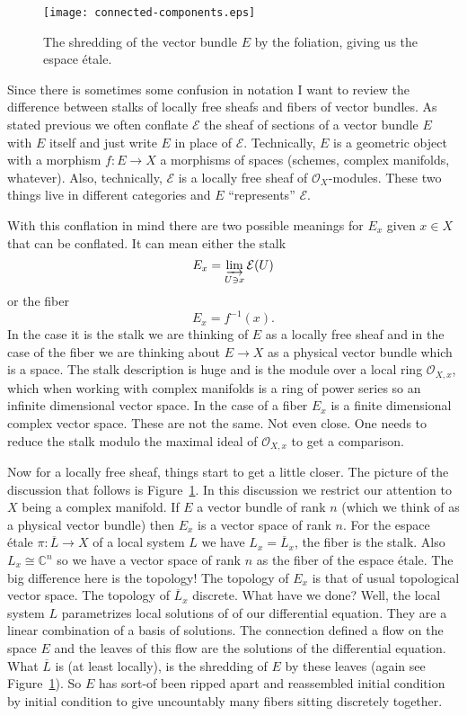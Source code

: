 \documentclass[12pt]{book}
\numberwithin{equation}{section}
\theoremstyle{definition}
\theoremstyle{remark}
\newcommand{\CC}{\mathbb{C}}
\newcommand{\Ocal}{\mathcal{O}}
\begin{document}
\begin{figure}[h]
	\begin{center}
		\texttt{[image: connected-components.eps]}
	\end{center}
	\caption{The shredding of the vector bundle $E$ by the foliation, giving us the espace \'etale.}\label{F:connected-components}
\end{figure}


Since there is sometimes some confusion in notation I want to review the difference between stalks of locally free sheafs and fibers of vector bundles. 
As stated previous we often conflate $\mathcal{E}$ the sheaf of sections of a vector bundle $E$ with $E$ itself and just write $E$ in place of $\mathcal{E}$.
Technically, $E$ is a geometric object with a morphism $f: E\to X$ a morphisms of spaces (schemes, complex manifolds, whatever).  
Also, technically, $\mathcal{E}$ is a locally free sheaf of $\Ocal_X$-modules. 
These two things live in different categories and $E$ ``represents'' $\mathcal{E}$.

With this conflation in mind there are two possible meanings for $E_x$ given $x\in X$ that can be conflated. 
It can mean either the stalk 
$$E_x = \varinjlim_{U \owns x} \mathcal{E}(U)$$ 
or the fiber  
$$E_x = f^{-1}(x).$$
In the case it is the stalk we are thinking of $E$ as a locally free sheaf and in the case of the fiber we are thinking about $E \to X$ as a physical vector bundle which is a space. 
The stalk description is huge and is the module over a local ring $\Ocal_{X,x}$, which when working with complex manifolds is a ring of power series so an infinite dimensional vector space. 
In the case of a fiber $E_x$ is a finite dimensional complex vector space. 
These are not the same.
Not even close. 
One needs to reduce the stalk modulo the maximal ideal of $\Ocal_{X,x}$ to get a comparison.

Now for a locally free sheaf, things start to get a little closer.
The picture of the discussion that follows is Figure~\ref{F:connected-components}.
In this discussion we restrict our attention to $X$ being a complex manifold.
If $E$ a vector bundle of rank $n$ (which we think of as a physical vector bundle) then $E_x$ is a vector space of rank $n$. 
For the espace \'etale $\pi:\overline{L}\to X$ of a local system $L$ we have $L_x = \overline{L}_x$, the fiber is the stalk. 
Also $L_x \cong \CC^n$ so we have a vector space of rank $n$ as the fiber of the espace \'etale. 
The big difference here is the topology!
The topology of $E_x$ is that of usual topological vector space. 
The topology of $\overline{L}_x$ discrete.
What have we done?
Well, the local system $L$ parametrizes local solutions of of our differential equation.
They are a linear combination of a basis of solutions.
The connection defined a flow on the space $E$ and the leaves of this flow are the solutions of the differential equation. 
What $\overline{L}$ is (at least locally), is the shredding of $E$ by these leaves (again see Figure~\ref{F:connected-components}). 
So $E$ has sort-of been ripped apart and reassembled initial condition by initial condition to give uncountably many fibers sitting discretely together.
\end{document}
